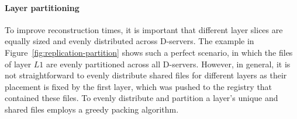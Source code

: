 \paragraph{Layer partitioning}
To improve reconstruction times, it is important that different layer slices
are equally sized and evenly distributed across D-servers.
The example in Figure~\ref{fig:replication-partition}
shows such a perfect scenario, in which the files of layer $L1$ are evenly partitioned across all D-servers.
However, in general, it is not straightforward to evenly distribute shared files for different
layers as their placement is fixed by the first layer, which was pushed to the registry that
contained these files.
%
To evenly distribute and partition a layer's unique and shared files
%
\sysname employs a greedy packing algorithm.

